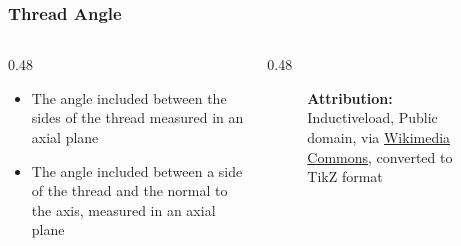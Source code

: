 \begin{frame}
	\frametitle{Thread Angle}

    \begin{columns}
        \begin{column}{0.48\linewidth}
            \begin{itemize}
                \item[Angle of Thread] The angle included between the sides of the thread measured in an axial plane
                \item[Half Angle of Thread] The angle included between a side of the thread and the normal to the axis, measured in an axial plane
            \end{itemize}
        \end{column}
        \begin{column}{0.48\linewidth}
            \begin{figure}
                \centering
                \resizebox{0.875\linewidth}{!}{
                    
                }

                \vspace{0.5em}
                {\tiny \textbf{Attribution:} Inductiveload, Public domain, via \href{https://commons.wikimedia.org/wiki/File:ISO_and_UTS_Thread_Dimensions.svg}{Wikimedia Commons}, converted to TikZ format\par}
            \end{figure}
        \end{column}
    \end{columns}
\end{frame}

